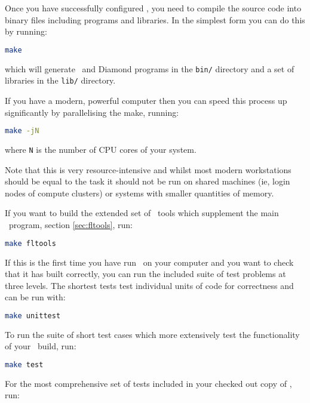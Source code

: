 Once you have successfully configured \fluidity, you need to compile the source
code into binary files including programs and libraries. In the simplest form
you can do this by running:

\begin{lstlisting}[language=Bash]
make
\end{lstlisting}

which will generate \fluidity\ and Diamond programs in the
\lstinline[language=Bash]+bin/+ directory and a set of libraries in the
\lstinline[language=Bash]+lib/+ directory.

If you have a modern, powerful computer then you can speed this process up
significantly by parallelising the make, running:

\begin{lstlisting}[language=Bash]
make -jN
\end{lstlisting}
where \lstinline[language=Bash]+N+ is the number of CPU cores of your system.

Note that this is very resource-intensive and whilst most modern workstations
should be equal to the task it should not be run on shared machines (ie, login
nodes of compute clusters) or systems with smaller quantities of memory.

If you want to build the extended set of \fluidity\ tools which supplement the
main \fluidity\ program, section \ref{sec:fltools}, run:

\begin{lstlisting}[language=Bash]
make fltools
\end{lstlisting}

If this is the first time you have run \fluidity\ on your computer and you want
to check that it has built correctly, you can run the included suite of test
problems at three levels. The shortest tests test individual units of code for
correctness and can be run with:

\begin{lstlisting}[language=Bash]
make unittest
\end{lstlisting}

To run the suite of short test cases which more extensively test the
functionality of your \fluidity\ build, run:

\begin{lstlisting}[language=Bash]
make test
\end{lstlisting}

For the most comprehensive set of tests included in your checked out copy of
\fluidity, run:


